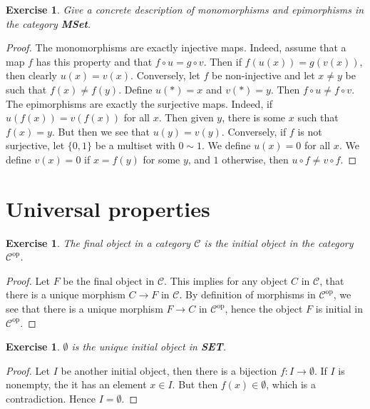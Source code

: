 \documentclass[a4paper, 11pt]{book}
\theoremstyle{plain}
\newtheorem{exercise}[theorem]{Exercise}
\theoremstyle{plain}
\begin{document}
\begin{exercise}
Give a concrete description of monomorphisms and epimorphisms in the category \textbf{MSet}.
\end{exercise}
\begin{proof}
The monomorphisms are exactly injective maps. Indeed, assume that a map $f$ has this property and that $f\circ u = g\circ v$. Then if $f(u(x)) = g(v(x))$, then clearly $u(x) = v(x)$. Conversely, let $f$ be non-injective and let $x\neq y$ be such that $f(x)\neq f(y)$. Define $u(*) = x$ and $v(*) = y$. Then $f\circ u \neq f\circ v$.\\
The epimorphisms are exactly the surjective maps. Indeed, if $u(f(x)) = v(f(x))$ for all $x$. Then given $y$, there is some $x$ such that $f(x)= y$. But then we see that $u(y) = v(y)$. Conversely, if $f$ is not surjective, let $\{0,1\}$ be a multiset with $0\sim 1$. We define $u(x) = 0$ for all $x$. We define $v(x) = 0$ if $x= f(y)$ for some $y$, and $1$ otherwise, then $u\circ f \neq v\circ f$.
\end{proof}

\section{Universal properties}
\begin{exercise}
The final object in a category $\mathcal{C}$ is the initial object in the category $\mathcal{C}^\text{op}$.
\end{exercise}
\begin{proof}
Let $F$ be the final object in $\mathcal{C}$. This implies for any object $C$ in $\mathcal{C}$, that there is a unique morphism $C\rightarrow F$ in $\mathcal{C}$. By definition of morphisms in $\mathcal{C}^\text{op}$, we see that there is a unique morphism $F\rightarrow C$ in $\mathcal{C}^\text{op}$, hence the object $F$ is initial in $\mathcal{C}^\text{op}$.
\end{proof}

\begin{exercise}
$\emptyset$ is the unique initial object in \textbf{SET}.
\end{exercise}
\begin{proof}
Let $I$ be another initial object, then there is a bijection $f:I\rightarrow \emptyset$. If $I$ is nonempty, the it has an element $x\in I$. But then $f(x)\in \emptyset$, which is a contradiction. Hence $I=\emptyset$.
\end{proof}
\end{document}
